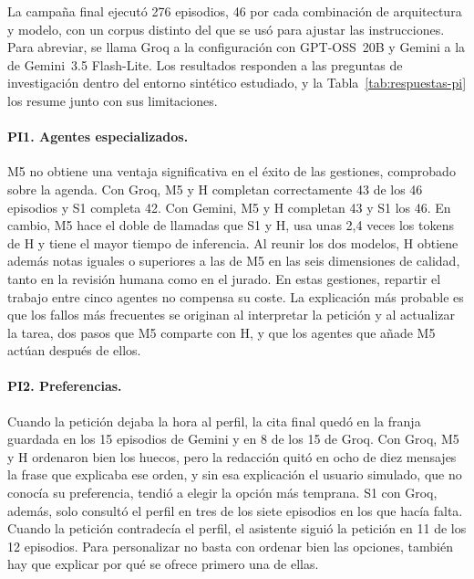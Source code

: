 La campaña final ejecutó 276 episodios, 46 por cada combinación de arquitectura
y modelo, con un corpus distinto del que se usó para ajustar las instrucciones.
Para abreviar, se llama Groq a la configuración con GPT-OSS~20B y Gemini a la de
Gemini~3.5 Flash-Lite. Los resultados responden a las preguntas de
investigación dentro del entorno sintético estudiado, y la
Tabla~\ref{tab:respuestas-pi} los resume junto con sus limitaciones.

\paragraph{PI1. Agentes especializados.}
M5 no obtiene una ventaja significativa en el éxito de las gestiones,
comprobado sobre la agenda. Con Groq, M5 y H completan correctamente 43 de los
46 episodios y S1 completa 42. Con Gemini, M5 y H completan 43 y S1 los 46. En
cambio, M5 hace el doble de llamadas que S1 y H, usa unas 2,4 veces los tokens
de H y tiene el mayor tiempo de inferencia. Al reunir los dos modelos, H
obtiene además notas iguales o superiores a las de M5 en las seis dimensiones
de calidad, tanto en la revisión humana como en el jurado. En estas gestiones, repartir el trabajo entre cinco agentes no compensa
su coste. La explicación más probable es que los fallos más frecuentes se
originan al interpretar la petición y al actualizar la tarea, dos pasos que M5
comparte con H, y que los agentes que añade M5 actúan después de ellos.

\paragraph{PI2. Preferencias.}
Cuando la petición dejaba la hora al perfil, la cita final quedó en la franja
guardada en los 15 episodios de Gemini y en 8 de los 15 de Groq. Con Groq, M5 y
H ordenaron bien los huecos, pero la redacción quitó en ocho de diez mensajes la
frase que explicaba ese orden, y sin esa explicación el usuario simulado, que no
conocía su preferencia, tendió a elegir la opción más temprana. S1 con Groq,
además, solo consultó el perfil en tres de los siete episodios en los que hacía
falta. Cuando la petición contradecía el perfil, el asistente siguió la
petición en 11 de los 12 episodios. Para personalizar no basta con ordenar bien
las opciones, también hay que explicar por qué se ofrece primero una de ellas.

